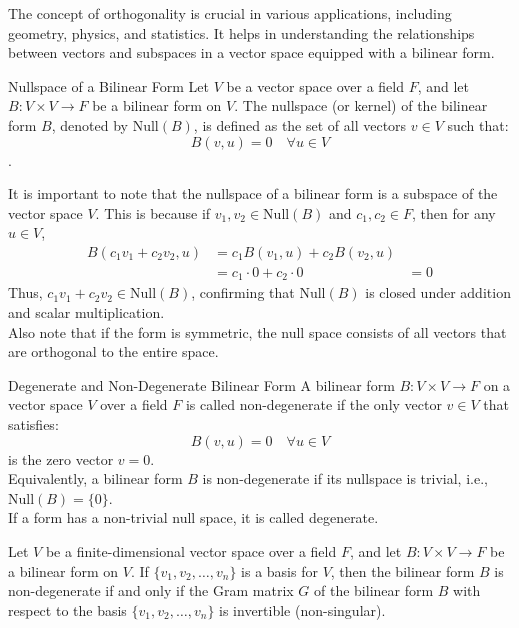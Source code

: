 \documentclass[openany]{book}
\begin{document}
The concept of orthogonality is crucial in various applications, including geometry, physics, and statistics. It helps in understanding the relationships between vectors and subspaces in a vector space equipped with a bilinear form.
\begin{mydefinition}{Nullspace of a Bilinear Form}
Let $V$ be a vector space over a field $F$, and let $B: V \times V \to F$ be a bilinear form on $V$. The nullspace (or kernel) of the bilinear form $B$, denoted by $\text{Null}(B)$, is defined as the set of all vectors $v \in V$ such that:
$$B(v, u) = 0 \quad \forall u \in V$$.
\end{mydefinition}
\begin{mynote}
    It is important to note that the nullspace of a bilinear form is a subspace of the vector space $V$. This is because if $v_1, v_2 \in \text{Null}(B)$ and $c_1, c_2 \in F$, then for any $u \in V$,
    \[\begin{aligned}
    B(c_1 v_1 + c_2 v_2, u) &= c_1 B(v_1, u) + c_2 B(v_2, u) \\
    &= c_1 \cdot 0 + c_2 \cdot 0
    &= 0
    \end{aligned}\]
    Thus, $c_1 v_1 + c_2 v_2 \in \text{Null}(B)$, confirming that $\text{Null}(B)$ is closed under addition and scalar multiplication. \\
    Also note that if the form is symmetric, the null space consists of all vectors that are orthogonal to the entire space.
\end{mynote}
\begin{mydefinition}{Degenerate and Non-Degenerate Bilinear Form}
A bilinear form $B: V \times V \to F$ on a vector space $V$ over a field $F$ is called non-degenerate if the only vector $v \in V$ that satisfies:
$$B(v, u) = 0 \quad \forall u \in V$$
is the zero vector $v = 0$. \\
Equivalently, a bilinear form $B$ is non-degenerate if its nullspace is trivial, i.e., $\text{Null}(B) = \{0\}$. \\
If a form has a non-trivial null space, it is called degenerate.    
\end{mydefinition}
\begin{mytheorem}
Let $V$ be a finite-dimensional vector space over a field $F$, and let $B: V \times V \to F$ be a bilinear form on $V$. If $\{v_1, v_2, \ldots, v_n\}$ is a basis for $V$, then the bilinear form $B$ is non-degenerate if and only if the Gram matrix $G$ of the bilinear form $B$ with respect to the basis $\{v_1, v_2, \ldots, v_n\}$ is invertible (non-singular).
\end{mytheorem}
\end{document}
